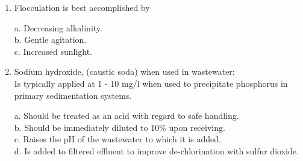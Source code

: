 \begin{tcolorbox}[breakable, enhanced,
colframe=blue!25,
colback=blue!10,
coltitle=blue!20!black,  
title= Chapter Assessment]
\begin{enumerate}
\item Flocculation is best accomplished by 

a. Decreasing alkalinity. \\
b. Gentle agitation. \\
c. Increased sunlight. \\

\item  Sodium hydroxide, (caustic soda) when used in wastewater: \\
Is typically applied at 1 - 10 mg/l when used to precipitate phosphorus in primary sedimentation systems. 

a. Should be treated as an acid with regard to safe handling. \\
b. Should be immediately diluted to 10\% upon receiving. \\
c. Raises the pH of the wastewater to which it is added. \\
d. Is added to filtered effluent to improve de-chlorination with sulfur dioxide. 

\end{enumerate}
\end{tcolorbox}

